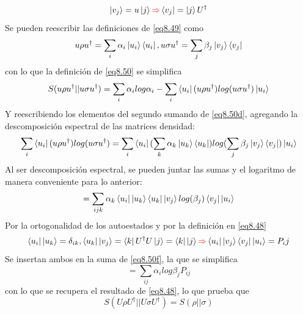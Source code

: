 \documentclass{book}
\begin{document}
     \begin{equation}\label{eq8.50b}{ \ket{v_j}= u\ket{j} \textcolor{red}{\Rightarrow} \bra{v_j}=\ket{j}U^\dag}\end{equation}
     Se pueden reescribir las definiciones de \ref{eq8.49} como
     \begin{equation}\label{eq8.50c}{u\rho u^\dag=\sum_i \alpha_i \ket{u_i}\bra{u_i}, u\sigma u^\dag=\sum_j \beta_j \ket{v_j}\bra{v_j}}\end{equation}
     con lo que la definición de \ref{eq8.50} se simplifica
     \begin{equation}\label{eq8.50d}{S(u\rho u^\dag||u\sigma u^\dag)=\sum_i \alpha_i log \alpha_i - \sum_i\bra{u_i} (u\rho u^\dag) log (u\sigma u^\dag) \ket{u_i} }\end{equation}
     Y reescribiendo los elementos del segundo sumando de \ref{eq8.50d}, agregando la descomposición espectral de las matrices densidad: 
     \begin{equation}\label{eq8.50e}{  \sum_i\bra{u_i} (u\rho u^\dag) log (u\sigma u^\dag)=\sum_i\bra{u_i}(\sum_k \alpha_k \ket{u_k}\bra{u_k})log(\sum_j \beta_j \ket{v_j}\bra{v_j})\ket{u_i}}\end{equation}
     Al ser descomposición espectral, se pueden juntar las sumas y el logaritmo de manera conveniente para lo anterior:
     \begin{equation}\label{eq8.50f}{=\sum_{ijk}\alpha_k\bra{u_i}\ket{u_k}\bra{u_k}\ket{v_j} log(\beta_j)\bra{v_j}\ket{u_i}}\end{equation}
     Por la ortogonalidad de los autoestados y por la definición en \ref{eq8.48} \begin{equation}{ \label{eq8.50g} \bra{u_i}\ket{u_k}=\delta_{ik}, \bra{u_k}\ket{v_j}=\bra{k}U^\dag U \ket{j} = \bra{k}\ket{j}\textcolor{red}{\Rightarrow} \bra{u_i}\ket{v_j}\bra{v_j}\ket{u_i}=P_ij}\end{equation}
     Se insertan ambos en la suma de \ref{eq8.50f}, la que se simplifica
    \begin{equation}\label{eq8.50h}{=\sum_{ij}\alpha_i log\beta_j P_{ij}}\end{equation} 
    con lo que se recupera el resultado de \ref{eq8.48}, lo que prueba que 
    \begin{equation}\label{eq8.51}{S(U\rho U^\dag||U\sigma U^\dag)=S(\rho||\sigma)}\end{equation}
\end{document}
